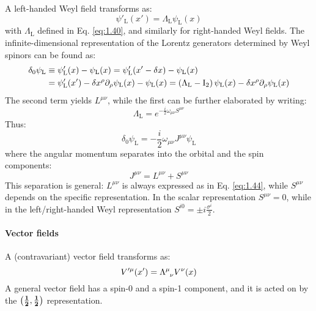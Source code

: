 A left-handed Weyl field transforms as:
\begin{equation}
  \psi'_\text{L}(x') = \Lambda_\text{L} \psi_\text{L}(x)
  \label{eq:1.45}
\end{equation}
with $ \Lambda_\text{L} $ defined in Eq. \ref{eq:1.40}, and similarly for right-handed Weyl fields. The infinite-dimensional representation of the Lorentz generators determined by Weyl spinors can be found as:
\begin{equation*}
  \begin{split}
    \delta_0 \psi_\text{L} &\equiv \psi'_\text{L}(x) - \psi_\text{L}(x) = \psi'_\text{L}(x' - \delta x) - \psi_\text{L}(x) \\
                           &= \psi'_\text{L}(x') - \delta x^\rho \partial_\rho \psi_\text{L}(x) - \psi_\text{L}(x) = \left( \Lambda_\text{L} - \mathrm{I}_2 \right) \psi_\text{L}(x) - \delta x^\rho \partial_\rho \psi_\text{L}(x)
  \end{split}
\end{equation*}
The second term yields $ L^{\mu \nu} $, while the first can be further elaborated by writing:
\begin{equation}
  \Lambda_\text{L} = e^{-\frac{i}{2} \omega_{\mu \nu} S^{\mu \nu}}
  \label{eq:1.46}
\end{equation}
Thus:
\begin{equation*}
  \delta_0 \psi_\text{L} = - \frac{i}{2} \omega_{\mu \nu} J^{\mu \nu} \psi_\text{L}
\end{equation*}
where the angular momentum separates into the orbital and the spin components:
\begin{equation}
  J^{\mu \nu} = L^{\mu \nu} + S^{\mu \nu}
  \label{eq:1.47}
\end{equation}
This separation is general: $ L^{\mu \nu} $ is always expressed as in Eq. \ref{eq:1.44}, while $ S^{\mu \nu} $ depends on the specific representation. In the scalar representation $ S^{\mu \nu} = 0 $, while in the left/right-handed Weyl representation $ S^{i0} = \pm i \frac{\sigma^i}{2} $.

\paragraph{Vector fields}

A (contravariant) vector field transforms as:
\begin{equation}
  V'^\mu(x') = \tensor{\Lambda}{^\mu_\nu} V^\nu(x)
  \label{eq:1.48}
\end{equation}
A general vector field has a spin-0 and a spin-1 component, and it is acted on by the $ \mathbf{\left( \frac{1}{2},\frac{1}{2} \right)} $ representation.

